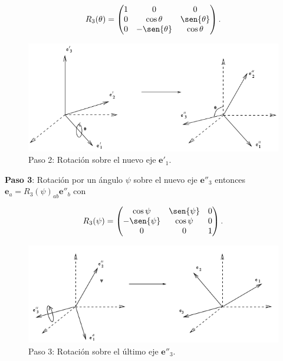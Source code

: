 \documentclass[a4paper,10pt]{article}
\numberwithin{equation}{section}
\begin{document}
\begin{equation}
 R_3(\theta) = \begin{pmatrix}
              1 & 0 & 0 \\
	      0 & \cos{\theta} & \sen{\theta} \\
	      0 & -\sen{\theta} & \cos{\theta}
	     \end{pmatrix}.
\end{equation}

\begin{figure}[H]
  \center 
  \includegraphics[scale=0.6]{problema5fig3}
  \caption{Paso 2: Rotación sobre el nuevo eje $\mathbf{e}'_1$.}
\end{figure}

\textbf{Paso 3}: Rotación por un ángulo $\psi$ sobre el nuevo eje $\mathbf{e}''_3$ 
entonces $\mathbf{e}_a = R_3(\psi)_{ab}\mathbf{e}''_b$ con 

\begin{equation}
 R_3(\psi) = \begin{pmatrix}
              \cos{\psi} & \sen{\psi} & 0 \\
	      -\sen{\psi} & \cos{\psi} & 0 \\
	      0 & 0 & 1
	     \end{pmatrix}.
\end{equation}

\begin{figure}[H]
  \center 
  \includegraphics[scale=0.66]{problema5fig4}
  \caption{Paso 3: Rotación sobre el último eje $\mathbf{e}''_3$.}
\end{figure}
\end{document}
